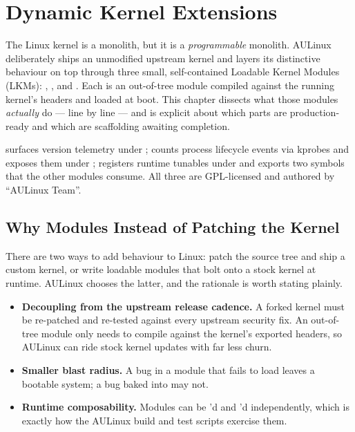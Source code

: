 \chapter{Dynamic Kernel Extensions}
\label{chap:kernel}

The Linux kernel is a monolith, but it is a \emph{programmable} monolith. AULinux
deliberately ships an unmodified upstream kernel and layers its distinctive
behaviour on top through three small, self-contained Loadable Kernel Modules
(LKMs): , , and .
Each is an out-of-tree module compiled against the running kernel's headers and
loaded at boot. This chapter dissects what those modules \emph{actually} do —
line by line — and is explicit about which parts are production-ready and which
are scaffolding awaiting completion.

\begin{infobox}
 surfaces version telemetry under ;
 counts process lifecycle events via kprobes and exposes
them under ;  registers runtime
tunables under  and exports two symbols that the other
modules consume. All three are GPL-licensed and authored by ``AULinux Team''.
\end{infobox}

\section{Why Modules Instead of Patching the Kernel}

There are two ways to add behaviour to Linux: patch the source tree and ship a
custom kernel, or write loadable modules that bolt onto a stock kernel at
runtime. AULinux chooses the latter, and the rationale is worth stating plainly.

\begin{itemize}
  \item \textbf{Decoupling from the upstream release cadence.} A forked kernel
        must be re-patched and re-tested against every upstream security fix. An
        out-of-tree module only needs to compile against the kernel's exported
        headers, so AULinux can ride stock kernel updates with far less churn.
  \item \textbf{Smaller blast radius.} A bug in a module that fails to load
        leaves a bootable system; a bug baked into  may not.
  \item \textbf{Runtime composability.} Modules can be 'd and
        'd independently, which is exactly how the AULinux build and
        test scripts exercise them.
\end{itemize}

